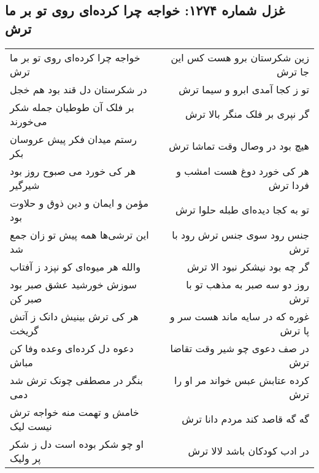 \begin{center}
\section*{غزل شماره ۱۲۷۴: خواجه چرا کرده‌ای روی تو بر ما ترش}
\label{sec:1274}
\begin{longtable}{l p{0.5cm} r}
خواجه چرا کرده‌ای روی تو بر ما ترش
&&
زین شکرستان برو هست کس این جا ترش
\\
در شکرستان دل قند بود هم خجل
&&
تو ز کجا آمدی ابرو و سیما ترش
\\
بر فلک آن طوطیان جمله شکر می‌خورند
&&
گر نپری بر فلک منگر بالا ترش
\\
رستم میدان فکر پیش عروسان بکر
&&
هیچ بود در وصال وقت تماشا ترش
\\
هر کی خورد می صبوح روز بود شیرگیر
&&
هر کی خورد دوغ هست امشب و فردا ترش
\\
مؤمن و ایمان و دین ذوق و حلاوت بود
&&
تو به کجا دیده‌ای طبله حلوا ترش
\\
این ترشی‌ها همه پیش تو زان جمع شد
&&
جنس رود سوی جنس ترش رود با ترش
\\
والله هر میوه‌ای کو نپزد ز آفتاب
&&
گر چه بود نیشکر نبود الا ترش
\\
سوزش خورشید عشق صبر بود صبر کن
&&
روز دو سه صبر به مذهب تو با ترش
\\
هر کی ترش بینیش دانک ز آتش گریخت
&&
غوره که در سایه ماند هست سر و پا ترش
\\
دعوه دل کرده‌ای وعده وفا کن مباش
&&
در صف دعوی چو شیر وقت تقاضا ترش
\\
بنگر در مصطفی چونک ترش شد دمی
&&
کرده عتابش عبس خواند مر او را ترش
\\
خامش و تهمت منه خواجه ترش نیست لیک
&&
گه گه قاصد کند مردم دانا ترش
\\
او چو شکر بوده است دل ز شکر پر ولیک
&&
در ادب کودکان باشد لالا ترش
\\
\end{longtable}
\end{center}

